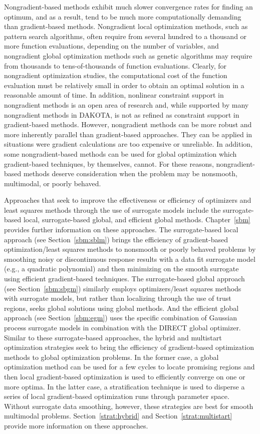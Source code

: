 Nongradient-based methods exhibit much slower convergence rates for
finding an optimum, and as a result, tend to be much more
computationally demanding than gradient-based methods. Nongradient
local optimization methods, such as pattern search algorithms, often
require from several hundred to a thousand or more function
evaluations, depending on the number of variables, and nongradient
global optimization methods such as genetic algorithms may require
from thousands to tens-of-thousands of function evaluations. Clearly,
for nongradient optimization studies, the computational cost of the
function evaluation must be relatively small in order to obtain an
optimal solution in a reasonable amount of time. In addition,
nonlinear constraint support in nongradient methods is an open area of
research and, while supported by many nongradient methods in DAKOTA,
is not as refined as constraint support in gradient-based
methods. However, nongradient methods can be more robust and more
inherently parallel than gradient-based approaches. They can be
applied in situations were gradient calculations are too expensive or
unreliable. In addition, some nongradient-based methods can be used
for global optimization which gradient-based techniques, by
themselves, cannot. For these reasons, nongradient-based methods
deserve consideration when the problem may be nonsmooth, multimodal,
or poorly behaved.

Approaches that seek to improve the effectiveness or efficiency of
optimizers and least squares methods through the use of surrogate
models include the surrogate-based local, surrogate-based global, and
efficient global methods.  Chapter~\ref{sbm} provides further
information on these approaches.  The surrogate-based local approach
(see Section~\ref{sbm:sblm}) brings the efficiency of gradient-based
optimization/least squares methods to nonsmooth or poorly behaved
problems by smoothing noisy or discontinuous response results with a
data fit surrogate model (e.g., a quadratic polynomial) and then
minimizing on the smooth surrogate using efficient gradient-based
techniques.  The surrogate-based global approach (see
Section~\ref{sbm:sbgm}) similarly employs optimizers/least squares
methods with surrogate models, but rather than localizing through the
use of trust regions, seeks global solutions using global methods.
And the efficient global approach (see Section~\ref{sbm:egm}) uses the
specific combination of Gaussian process surrogate models in
combination with the DIRECT global optimizer.  Similar to these
surrogate-based approaches, the hybrid and multistart optimization
strategies seek to bring the efficiency of gradient-based optimization
methods to global optimization problems.  In the former case, a global
optimization method can be used for a few cycles to locate promising
regions and then local gradient-based optimization is used to
efficiently converge on one or more optima. In the latter case, a
stratification technique is used to disperse a series of local
gradient-based optimization runs through parameter space.  Without
surrogate data smoothing, however, these strategies are best for
smooth multimodal problems. Section~\ref{strat:hybrid} and
Section~\ref{strat:multistart} provide more information on these
approaches.

